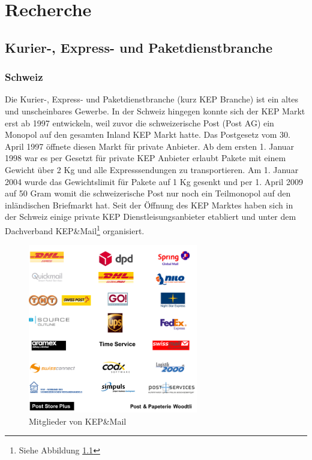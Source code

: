 \chapter{Recherche}
\label{sec:recherche}

\section{Kurier-, Express- und Paketdienstbranche}
\subsection{Schweiz}
Die Kurier-, Express- und Paketdienstbranche (kurz KEP Branche) ist ein altes und unscheinbares Gewerbe. In der Schweiz hingegen konnte sich der KEP Markt erst ab 1997 entwickeln, weil zuvor die schweizerische Post (Post AG) ein Monopol auf den gesamten Inland KEP Markt hatte. Das Postgesetz vom 30. April 1997\citep[]{postgesetz.sr783} öffnete diesen Markt für private Anbieter. Ab dem ersten 1. Januar 1998 war es per Gesetzt für private KEP Anbieter erlaubt Pakete mit einem Gewicht über 2 Kg und alle Expresssendungen zu transportieren. Am 1. Januar 2004 wurde das Gewichtslimit für Pakete auf 1 Kg gesenkt und per 1. April 2009 auf 50 Gram womit die schweizerische Post nur noch ein Teilmonopol auf den inländischen Briefmarkt hat. Seit der Öffnung des KEP Marktes haben sich in der Schweiz einige private KEP Dienstleisungsanbieter etabliert und unter dem Dachverband KEP\&Mail\footnote{Siehe Abbildung \ref{fig1:kepmail}} organisiert.
\begin{figure}[ht]
	\centering
  \includegraphics[width=0.66\textwidth]{images/kepmailMitglieder.png}
	\caption{Mitglieder von KEP\&Mail}
	\label{fig1:kepmail}
\end{figure}
